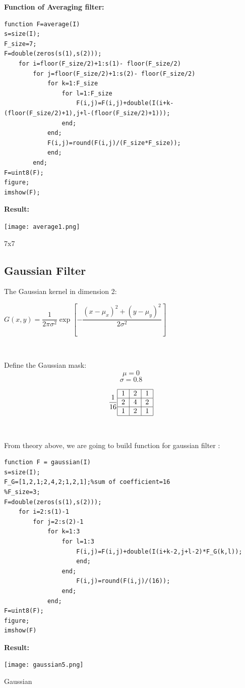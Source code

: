 \documentclass[10pt]{article}
\begin{document}
\textbf{Function of Averaging filter:}
\begin{lstlisting}
function F=average(I)
s=size(I);
F_size=7;
F=double(zeros(s(1),s(2)));
	for i=floor(F_size/2)+1:s(1)- floor(F_size/2)
		for j=floor(F_size/2)+1:s(2)- floor(F_size/2)
			for k=1:F_size
				for l=1:F_size
					F(i,j)=F(i,j)+double(I(i+k-(floor(F_size/2)+1),j+l-(floor(F_size/2)+1)));
				end;
			end;
			F(i,j)=round(F(i,j)/(F_size*F_size));
			end;
		end;
F=uint8(F);
figure;
imshow(F);
\end{lstlisting}



\textbf{Result:}

\begin{center}
	\texttt{[image: average1.png]}
	
	7x7
\end{center}

\subsection{Gaussian Filter}

The Gaussian kernel in dimension 2:


$G(x,y) = \dfrac{1}{2\pi\sigma^2}\exp\left[-\dfrac{(x-\mu_x)^2+(y-\mu_y)^2}{2\sigma^2}\right ]$

\

Define the Gaussian mask:
$$\mu = 0$$
$$\sigma = 0.8$$


$$\dfrac{1}{16}\begin{tabular}{|c|c|c|}
	\hline 
	1 & 2 & 1 \\ 
	\hline 
	2 & 4 & 2 \\ 
	\hline 
	1 & 2 & 1 \\ 
	\hline 
\end{tabular} $$

\

From theory above, we are going to build function for gaussian filter :
\begin{lstlisting}
function F = gaussian(I) 
s=size(I);
F_G=[1,2,1;2,4,2;1,2,1];%sum of coefficient=16
%F_size=3;
F=double(zeros(s(1),s(2)));
	for i=2:s(1)-1
		for j=2:s(2)-1
			for k=1:3
				for l=1:3
					F(i,j)=F(i,j)+double(I(i+k-2,j+l-2)*F_G(k,l));
					end;
				end;
					F(i,j)=round(F(i,j)/(16));
				end;
			end;
F=uint8(F);
figure;
imshow(F)
\end{lstlisting}

\textbf{Result:}
\begin{center}
\texttt{[image: gaussian5.png]}	

Gaussian
\end{center}
\end{document}
